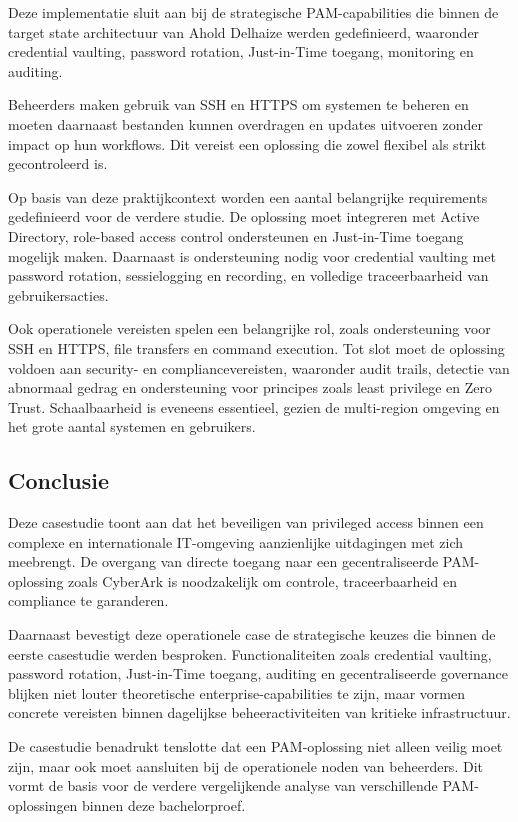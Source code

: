 Deze implementatie sluit aan bij de strategische PAM-capabilities die binnen de target state architectuur van Ahold Delhaize werden gedefinieerd, waaronder credential vaulting, password rotation, Just-in-Time toegang, monitoring en auditing.
 
Beheerders maken gebruik van SSH en HTTPS om systemen te beheren en moeten daarnaast bestanden kunnen overdragen en updates uitvoeren zonder impact op hun workflows. Dit vereist een oplossing die zowel flexibel als strikt gecontroleerd is.
 
Op basis van deze praktijkcontext worden een aantal belangrijke requirements gedefinieerd voor de verdere studie. De oplossing moet integreren met Active Directory, role-based access control ondersteunen en Just-in-Time toegang mogelijk maken. Daarnaast is ondersteuning nodig voor credential vaulting met password rotation, sessielogging en recording, en volledige traceerbaarheid van gebruikersacties.
 
Ook operationele vereisten spelen een belangrijke rol, zoals ondersteuning voor SSH en HTTPS, file transfers en command execution. Tot slot moet de oplossing voldoen aan security- en compliancevereisten, waaronder audit trails, detectie van abnormaal gedrag en ondersteuning voor principes zoals least privilege en Zero Trust. Schaalbaarheid is eveneens essentieel, gezien de multi-region omgeving en het grote aantal systemen en gebruikers.

\subsection{Conclusie} 
Deze casestudie toont aan dat het beveiligen van privileged access binnen een complexe en internationale IT-omgeving aanzienlijke uitdagingen met zich meebrengt. De overgang van directe toegang naar een gecentraliseerde PAM-oplossing zoals CyberArk is noodzakelijk om controle, traceerbaarheid en compliance te garanderen.

Daarnaast bevestigt deze operationele case de strategische keuzes die binnen de eerste casestudie werden besproken. Functionaliteiten zoals credential vaulting, password rotation, Just-in-Time toegang, auditing en gecentraliseerde governance blijken niet louter theoretische enterprise-capabilities te zijn, maar vormen concrete vereisten binnen dagelijkse beheeractiviteiten van kritieke infrastructuur.

De casestudie benadrukt tenslotte dat een PAM-oplossing niet alleen veilig moet zijn, maar ook moet aansluiten bij de operationele noden van beheerders. Dit vormt de basis voor de verdere vergelijkende analyse van verschillende PAM-oplossingen binnen deze bachelorproef.

